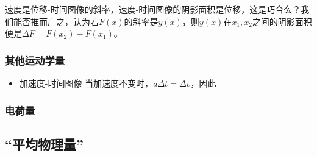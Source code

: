 速度是位移-时间图像的斜率，速度-时间图像的阴影面积是位移，这是巧合么？我们能否推而广之，认为若$F(x)$的斜率是$y(x)$，则$y(x)$在$x_1,x_2$之间的阴影面积便是$\Delta F=F(x_2)-F(x_1)$。
\subsubsection{其他运动学量}
\begin{itemize}
\item 加速度-时间图像 当加速度不变时，$a\Delta t=\Delta v$，因此
\end{itemize}

\subsubsection{电荷量}
\subsection{“平均物理量”}